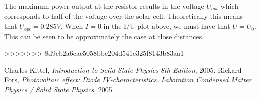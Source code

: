 \documentclass[a4paper,twoside=false,abstract=false,numbers=noenddot,
titlepage=false,headings=small,parskip=half,version=last]{scrartcl}
\begin{document}
The maximum power output at the resistor results in the voltage $ U_{opt}$ which corresponds to half of the voltage over the solar cell. Theoretically this means that $U_{opt} = 0.285 V$. When $I=0$ in the I/U-plot above, we must have that $U = U_0$. This can be seen to be approximately the case at close distances.

>>>>>>> 8d9cb2a6cac5058bbe204d541e325f8143b83aa1

\begin{thebibliography}{1}
        Charles Kittel,
        {\em Introduction to Solid State Physics 8th Edition},
        2005.
		Rickard Fors,
		{\em Photovoltaic effect: Diode IV-characteristics. Laboration Condensed Matter Physics / Solid State Physics},
		2005.
\end{thebibliography}
\end{document}

